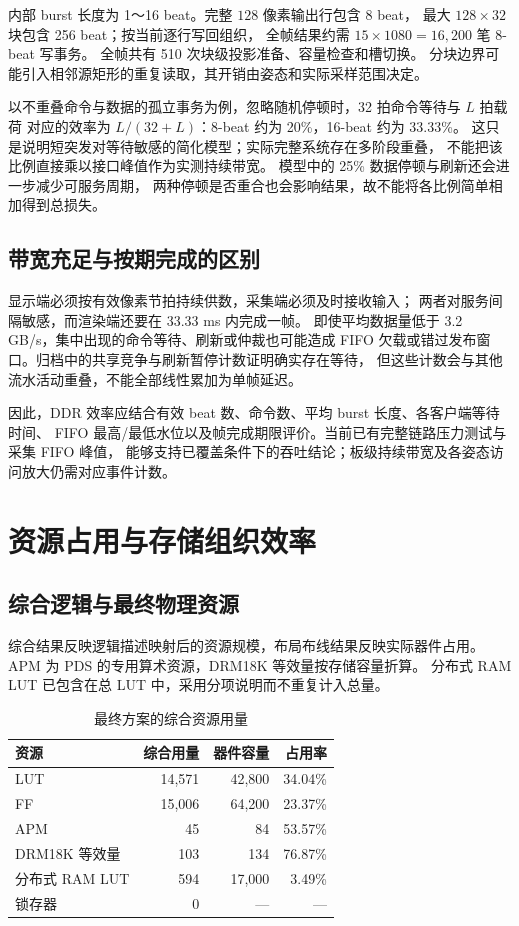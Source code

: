 内部 burst 长度为 1～16 beat。完整 $128$ 像素输出行包含 8 beat，
最大 $128\times32$ 块包含 256 beat；按当前逐行写回组织，
全帧结果约需 $15\times1080=16,200$ 笔 8-beat 写事务。
全帧共有 510 次块级投影准备、容量检查和槽切换。
分块边界可能引入相邻源矩形的重复读取，其开销由姿态和实际采样范围决定。

以不重叠命令与数据的孤立事务为例，忽略随机停顿时，32 拍命令等待与 $L$ 拍载荷
对应的效率为 $L/(32+L)$：8-beat 约为 20\%，16-beat 约为 33.33\%。
这只是说明短突发对等待敏感的简化模型；实际完整系统存在多阶段重叠，
不能把该比例直接乘以接口峰值作为实测持续带宽。
模型中的 25\% 数据停顿与刷新还会进一步减少可服务周期，
两种停顿是否重合也会影响结果，故不能将各比例简单相加得到总损失。

\subsection{带宽充足与按期完成的区别}
显示端必须按有效像素节拍持续供数，采集端必须及时接收输入；
两者对服务间隔敏感，而渲染端还要在 33.33 ms 内完成一帧。
即使平均数据量低于 3.2 GB/s，集中出现的命令等待、刷新或仲裁也可能造成
FIFO 欠载或错过发布窗口。归档中的共享竞争与刷新暂停计数证明确实存在等待，
但这些计数会与其他流水活动重叠，不能全部线性累加为单帧延迟。

因此，DDR 效率应结合有效 beat 数、命令数、平均 burst 长度、各客户端等待时间、
FIFO 最高/最低水位以及帧完成期限评价。当前已有完整链路压力测试与采集 FIFO 峰值，
能够支持已覆盖条件下的吞吐结论；板级持续带宽及各姿态访问放大仍需对应事件计数。

\section{资源占用与存储组织效率}
\subsection{综合逻辑与最终物理资源}
综合结果反映逻辑描述映射后的资源规模，布局布线结果反映实际器件占用。
APM 为 PDS 的专用算术资源，DRM18K 等效量按存储容量折算。
分布式 RAM LUT 已包含在总 LUT 中，采用分项说明而不重复计入总量。

\begin{table}[htbp]\centering\small
\caption{最终方案的综合资源用量}\label{tab:rt-synthesis}
\begin{tabularx}{\textwidth}{Yrrr}
\toprule
资源 & 综合用量 & 器件容量 & 占用率 \\
\midrule
LUT & 14,571 & 42,800 & 34.04\% \\
FF & 15,006 & 64,200 & 23.37\% \\
APM & 45 & 84 & 53.57\% \\
DRM18K 等效量 & 103 & 134 & 76.87\% \\
分布式 RAM LUT & 594 & 17,000 & 3.49\% \\
锁存器 & 0 & --- & --- \\
\bottomrule
\end{tabularx}
\end{table}

